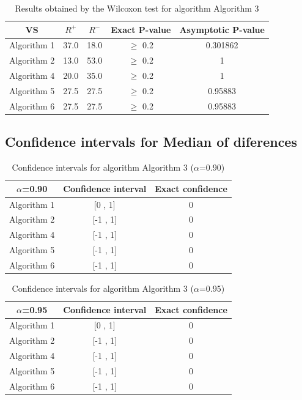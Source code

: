 \documentclass[a4paper,10pt]{article}
\begin{document}
\begin{table}[!htp]
\centering\small
\begin{tabular}{
|c|c|c|c|c|}
\hline
 VS & $R^{+}$ & $R^{-}$ & Exact P-value & Asymptotic P-value \\ \hline 
Algorithm 1 & 37.0 & 18.0 & $\geq$ 0.2 & 0.301862\\ \hline 
Algorithm 2 & 13.0 & 53.0 & $\geq$ 0.2 & 1\\ \hline 
Algorithm 4 & 20.0 & 35.0 & $\geq$ 0.2 & 1\\ \hline 
Algorithm 5 & 27.5 & 27.5 & $\geq$ 0.2 & 0.95883\\ \hline 
Algorithm 6 & 27.5 & 27.5 & $\geq$ 0.2 & 0.95883\\ \hline 

\end{tabular}
\caption{Results obtained by the Wilcoxon test for algorithm Algorithm 3}
\end{table}

\subsection{Confidence intervals for Median of diferences}

\begin{table}[!htp]
\centering\small
\begin{tabular}{
|c|c|c|}
\hline
 $\alpha$=0.90 & Confidence interval & Exact confidence \\ \hline 
Algorithm 1 & [0 , 1] & 0\\ \hline 
Algorithm 2 & [-1 , 1] & 0\\ \hline 
Algorithm 4 & [-1 , 1] & 0\\ \hline 
Algorithm 5 & [-1 , 1] & 0\\ \hline 
Algorithm 6 & [-1 , 1] & 0\\ \hline 

\end{tabular}
\caption{Confidence intervals for algorithm Algorithm 3 ($\alpha$=0.90)}
\end{table}
\begin{table}[!htp]
\centering\small
\begin{tabular}{
|c|c|c|}
\hline
 $\alpha$=0.95 & Confidence interval & Exact confidence \\ \hline 
Algorithm 1 & [0 , 1] & 0\\ \hline 
Algorithm 2 & [-1 , 1] & 0\\ \hline 
Algorithm 4 & [-1 , 1] & 0\\ \hline 
Algorithm 5 & [-1 , 1] & 0\\ \hline 
Algorithm 6 & [-1 , 1] & 0\\ \hline 

\end{tabular}
\caption{Confidence intervals for algorithm Algorithm 3 ($\alpha$=0.95)}
\end{table}
\end{document}
